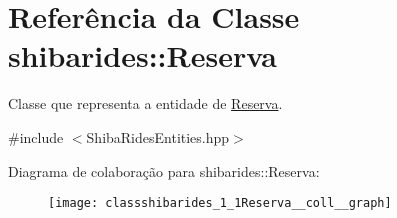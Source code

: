 \hypertarget{classshibarides_1_1Reserva}{}\section{Referência da Classe shibarides\+:\+:Reserva}
\label{classshibarides_1_1Reserva}


Classe que representa a entidade de \hyperlink{classshibarides_1_1Reserva}{Reserva}.  




{\ttfamily \#include $<$Shiba\+Rides\+Entities.\+hpp$>$}



Diagrama de colaboração para shibarides\+:\+:Reserva\+:\nopagebreak
\begin{figure}[H]
\begin{center}
\leavevmode
\texttt{[image: classshibarides\_1\_1Reserva\_\_coll\_\_graph]}
\end{center}
\end{figure}
